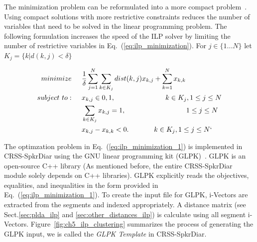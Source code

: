The minimization problem can be reformulated into a more compact problem~\cite{dupuy2014ILPimprovement}. 
Using compact solutions with more restrictive constraints reduces the number of variables that need to be solved in the linear programming problem. 
The following formulation increases the speed of the ILP solver by limiting the number of restrictive variables in Eq.~(\ref{eq:ilp_minimization}). For $j \in \{1 ... N\}$ let $K_j = \{k | d(k,j) < \delta\}$ 




\begin{equation}
\label{eq:ilp_minimization_1}
\begin{split}
minimize \hspace{0.2in}& \frac{1}{\delta}\sum\limits_{j=1}^{N}\sum\limits_{k\in K_j}dist(k,j)x_{k,j} + \sum\limits_{k=1}^{N}x_{k,k} \\
subject~to:  \hspace{0.2in}& x_{k,j} \in {0,1}, \hspace{1in} k \in K_j , 1 \leq j \leq N \\
 & \sum\limits_{k\in K_j}x_{k,j} = 1, \hspace{1.2in} 1 \leq j \leq N \\
 & x_{k,j} - x_{k,k} < 0. \hspace{0.5in} k \in K_j , 1 \leq j \leq N`
\end{split}
\end{equation}

The optimzation problem in Eq.~(\ref{eq:ilp_minimization_1}) is implemented in CRSS-SpkrDiar using the GNU linear programming kit (GLPK)~\cite{makhorin2008glpk}. GLPK is an open-source C++ library (As mentioned before, the entire CRSS-SpkrDiar module solely depends on C++ libraries). 
GLPK explicitly reads the objectives, equalities, and inequalities in the form provided in Eq.~(\ref{eq:ilp_minimization_1}). 
To create the input file for GLPK, i-Vectors are extracted from the segments and indexed appropriately. 
A distance matrix (see Sect.\ref{sec:plda_ilp} and \ref{sec:other_distances_ilp}) is calculate using all segment i-Vectors. 
Figure~\ref{fig:ch5_ilp_clustering} summarizes the process of generating the GLPK input, we is called the {\it GLPK Template} in CRSS-SpkrDiar. 

